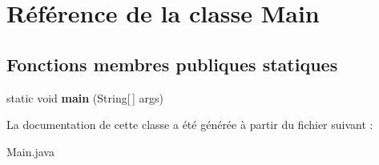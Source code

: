 \hypertarget{class_main}{}\section{Référence de la classe Main}
\label{class_main}
\subsection*{Fonctions membres publiques statiques}
\begin{DoxyCompactItemize}
\item 
static void {\bfseries main} (String\mbox{[}$\,$\mbox{]} args)\hypertarget{class_main_a8a5d0f827edddff706cc0e6740d0579a}{}\label{class_main_a8a5d0f827edddff706cc0e6740d0579a}

\end{DoxyCompactItemize}


La documentation de cette classe a été générée à partir du fichier suivant \+:\begin{DoxyCompactItemize}
\item 
Main.\+java\end{DoxyCompactItemize}
